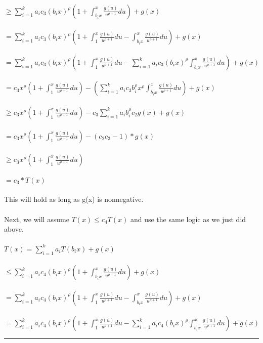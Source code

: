 \documentclass[tikz]{article}
\newcommand{\shortbar}{\begin{center}\rule{5ex}{0.1pt}\end{center}}
\theoremstyle{plain}
\theoremstyle{definition}
\theoremstyle{remark}
\newenvironment{solution}[1]{\medskip\noindent{\bf Problem #1.~}}{\shortbar}
\begin{document}
\begin{solution}{2}
\\
$\geq \sum_{i=1}^{k} a_i c_3(b_i x)^{\rho}(1 + \int_{b_ix}^{x} \frac{g(u)}{u^{\rho + 1}}du) + g(x)$\\
\\
$=\sum_{i=1}^{k} a_i c_3(b_i x)^{\rho}(1 + \int_{1}^{x} \frac{g(u)}{u^{\rho + 1}}du - \int_{b_ix}^{x} \frac{g(u)}{u^{\rho + 1}}du) + g(x)$\\
\\
$=\sum_{i=1}^{k} a_i c_3(b_i x)^{\rho}(1 + \int_{1}^{x} \frac{g(u)}{u^{\rho + 1}}du - \sum_{i=1}^{k}a_i c_3 (b_i x)^{\rho} \int_{b_ix}^{x} \frac{g(u)}{u^{\rho + 1}}du) + g(x)$\\
\\
$=c_3 x^{\rho}(1 + \int_{1}^{x} \frac{g(u)}{u^{\rho + 1}}du) - (\sum_{i=1}^{k} a_i c_3 b_i^{\rho} x^{\rho} \int_{b_ix}^{x} \frac{g(u)}{u^{\rho + 1}}du) + g(x)$\\
\\
$\geq c_3 x^{\rho}(1 + \int_{1}^{x} \frac{g(u)}{u^{\rho + 1}}du) - c_3\sum_{i=1}^{k} a_i b_i^{\rho} c_2 g(x) + g(x)$\\
\\
$=c_3 x^{\rho}(1 + \int_{1}^{x} \frac{g(u)}{u^{\rho + 1}}du) - (c_2 c_3 - 1) * g(x)$\\
\\
$\geq c_3 x^{\rho}(1 + \int_{1}^{x} \frac{g(u)}{u^{\rho + 1}}du)$\\
\\
$=c_3*T(x)$\\
\\
This will hold as long as g(x) is nonnegative.\\
\\
Next, we will assume $T(x) \leq c_4 T(x)$ and use the same logic as we just did above.\\
\\
$T(x) = \sum_{i=1}^{k} a_i T(b_i x) + g(x)$\\
\\
$\leq \sum_{i=1}^{k} a_i c_4(b_i x)^{\rho}(1 + \int_{b_ix}^{x} \frac{g(u)}{u^{\rho + 1}}du) + g(x)$\\
\\
$=\sum_{i=1}^{k} a_i c_4(b_i x)^{\rho}(1 + \int_{1}^{x} \frac{g(u)}{u^{\rho + 1}}du - \int_{b_ix}^{x} \frac{g(u)}{u^{\rho + 1}}du) + g(x)$\\
\\
$=\sum_{i=1}^{k} a_i c_4(b_i x)^{\rho}(1 + \int_{1}^{x} \frac{g(u)}{u^{\rho + 1}}du - \sum_{i=1}^{k}a_i c_4 (b_i x)^{\rho} \int_{b_ix}^{x} \frac{g(u)}{u^{\rho + 1}}du) + g(x)$\\

\end{solution}
\end{document}

